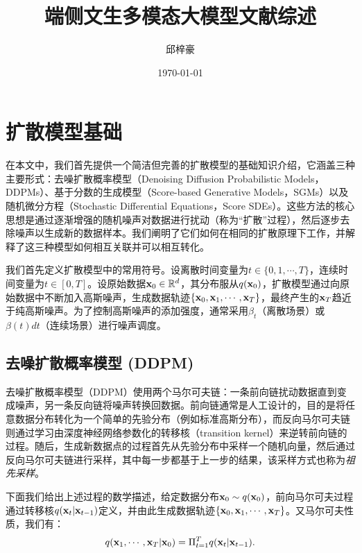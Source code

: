 \documentclass[11pt,a4paper,UTF8]{ctexart}
\title{端侧文生多模态大模型文献综述}
\author{邱梓豪}
\date{\today}
\begin{document}
\maketitle
\tableofcontents
\newpage

\section{扩散模型基础}

在本文中，我们首先提供一个简洁但完善的扩散模型的基础知识介绍，它涵盖三种主要形式：去噪扩散概率模型（Denoising Diffusion Probabilistic Models，DDPMs）\cite{sohldickstein2015diffusion,ho2020denoising}、基于分数的生成模型（Score-based Generative Models，SGMs）\cite{song2019generative,song2020improved}以及随机微分方程（Stochastic Differential Equations，Score SDEs）\cite{song2020score}。这些方法的核心思想是通过逐渐增强的随机噪声对数据进行扰动（称为“扩散”过程），然后逐步去除噪声以生成新的数据样本。我们阐明了它们如何在相同的扩散原理下工作，并解释了这三种模型如何相互关联并可以相互转化。

我们首先定义扩散模型中的常用符号。设离散时间变量为$t\in\{0,1,\cdots,T\}$，连续时间变量为$t\in[0,T]$。设原始数据$\mathbf{x}_0\in\mathbb{R}^d$，其分布服从$q(\mathbf{x}_0)$，扩散模型通过向原始数据中不断加入高斯噪声，生成数据轨迹$\{\mathbf{x}_0,\mathbf{x}_1,\cdots,\mathbf{x}_T\}$，最终产生的$\mathbf{x}_T$趋近于纯高斯噪声。为了控制高斯噪声的添加强度，通常采用$\beta_t$（离散场景）或$\beta(t)dt$（连续场景）进行噪声调度。

\subsection{去噪扩散概率模型 (DDPM)}

去噪扩散概率模型（DDPM）使用两个马尔可夫链：一条前向链扰动数据直到变成噪声，另一条反向链将噪声转换回数据。前向链通常是人工设计的，目的是将任意数据分布转化为一个简单的先验分布（例如标准高斯分布），而反向马尔可夫链则通过学习由深度神经网络参数化的转移核（transition kernel）来逆转前向链的过程。随后，生成新数据点的过程首先从先验分布中采样一个随机向量，然后通过反向马尔可夫链进行采样，其中每一步都基于上一步的结果，该采样方式也称为\emph{祖先采样}\cite{koller2009probabilistic}。

下面我们给出上述过程的数学描述，给定数据分布$\mathbf{x}_0\sim q(\mathbf{x}_0)$，前向马尔可夫过程通过转移核$q(\mathbf{x}_t|\mathbf{x}_{t-1})$定义，并由此生成数据轨迹$\{\mathbf{x}_0,\mathbf{x}_1,\cdots,\mathbf{x}_T\}$。又马尔可夫性质，我们有：
\begin{equation*}
    q(\mathbf{x}_1,\cdots,\mathbf{x}_T|\mathbf{x}_0)=\Pi_{t=1}^T q(\mathbf{x}_t|\mathbf{x}_{t-1}).
\end{equation*}
\end{document}
